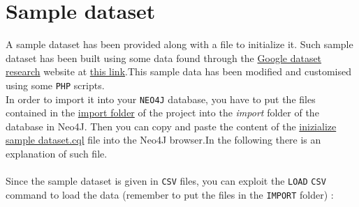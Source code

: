 \documentclass{article}
\begin{document}
\section{Sample dataset}
A sample dataset has been provided along with a file to initialize it. Such sample dataset has been built using some data found through the \href{https://datasetsearch.research.google.com}{Google dataset research} website at \href{https://www.kaggle.com/aleanfigeno/contact-tracing-application-sample-datasets/tasks}{this link}.This sample data has been modified and customised using some \verb|PHP| scripts.\\ In order to import it into your \verb |NEO4J| database, you have to put the files contained in the \href{https://github.com/filippolazzati/smbud/tree/main/graph\%20databases/sample\%20dataset\%20and\%20code/import}{import folder} of the project into the \textit{import} folder of the database in Neo4J. Then you can copy and paste the content of the \href{https://github.com/filippolazzati/smbud/blob/main/graph\%20databases/sample\%20dataset\%20and\%20code/inizialize\%20sample\%20dataset.cql}{inizialize sample dataset.cql} file into the Neo4J browser.In the following there is an explanation of such file.\\ \\
Since the sample dataset is given in \verb |CSV| files, you can exploit the \verb |LOAD| \verb |CSV| command to load the data (remember to put the files in the \verb |IMPORT| folder) :
\end{document}
